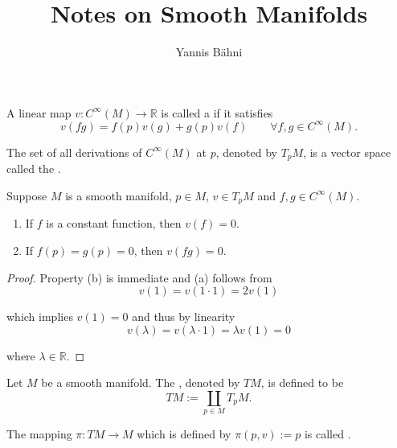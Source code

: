 

\title{Notes on Smooth Manifolds}
\author{Yannis B\"{a}hni}
\address[Yannis B\"{a}hni]{University of Zurich, R\"{a}mistrasse 71, 8006 Zurich}


\maketitle

\tableofcontents


\newpage
\begin{definition}
	A linear map $v: C^\infty(M) \to \mathbb{R}$ is called a  if it satisfies
	\begin{equation}
		v(fg) = f(p)v(g) + g(p)v(f) \qquad \forall f,g \in C^\infty(M).
	\end{equation}

	The set of all derivations of $C^\infty(M)$ at $p$, denoted by $T_pM$, is a vector space called the .
\end{definition}

\begin{lemma}
	Suppose $M$ is a smooth manifold, $p \in M$, $v \in T_pM$ and $f,g \in C^\infty(M)$.
	\begin{enumerate}[label = (\alph*)]
		\item If $f$ is a constant function, then $v(f) = 0$.
		\item If $f(p) = g(p) = 0$, then $v(fg) = 0$.
	\end{enumerate}
\end{lemma}

\begin{proof}
	Property (b) is immediate and (a) follows from
	\begin{equation}
		v(1) = v(1 \cdot 1) = 2v(1)
	\end{equation}

	\noindent which implies $v(1) = 0$ and thus by linearity 
	\begin{equation}
		v(\lambda) = v(\lambda \cdot 1) = \lambda v(1) = 0	
	\end{equation}

	\noindent where $\lambda \in \mathbb{R}$.
\end{proof} 

\begin{definition}
	Let $M$ be a smooth manifold. The , denoted by $TM$, is defined to be
	\begin{equation}
		TM := \coprod_{p \in M} T_p M.
	\end{equation}

	The mapping $\pi: TM \to M$ which is defined by $\pi(p,v) := p$ is called .
\end{definition}

